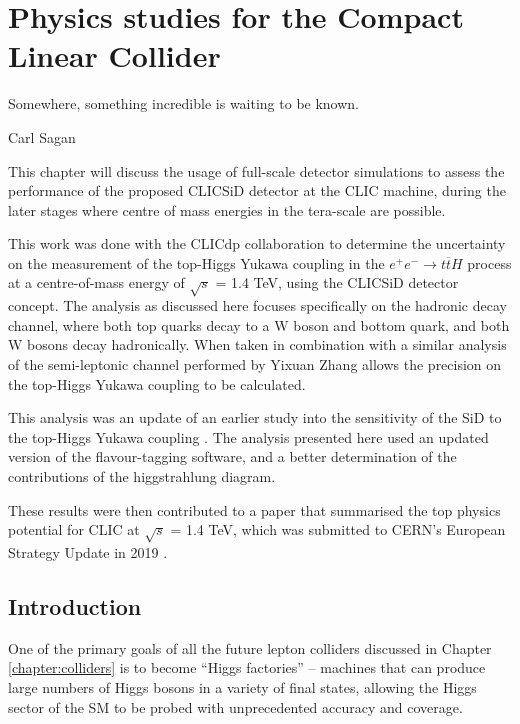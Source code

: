 
\chapter{Physics studies for the Compact Linear Collider}
\label{chapter:analysis}

\epigraph{Somewhere, something incredible is waiting to be known.}{Carl Sagan}

This chapter will discuss the usage of full-scale detector simulations to assess the performance of the proposed \acrshort{CLIC}\textunderscore \acrshort{SiD} detector at the \acrlong{CLIC} machine, during the later stages where centre of mass energies in the tera-scale are possible.

This work was done with the \acrfull{CLICdp} collaboration to determine the uncertainty on the measurement of the top-Higgs Yukawa coupling in the $e^+ e^- \rightarrow t\overline{t}H$ process at a centre-of-mass energy of $\sqrt{s}$ = 1.4 TeV, using the \acrshort{CLIC}\textunderscore \acrshort{SiD} detector concept. The analysis as discussed here focuses specifically on the hadronic decay channel, where both top quarks decay to a W boson and bottom quark, and both W bosons decay hadronically. When taken in combination with a similar analysis of the semi-leptonic channel performed by Yixuan Zhang  allows the precision on the top-Higgs Yukawa coupling to be calculated.

This analysis was an update of an earlier study into the sensitivity of the \acrshort{SiD} to the top-Higgs Yukawa coupling  . The analysis presented here used an updated version of the flavour-tagging software, and a better determination of the contributions of the higgstrahlung diagram.

These results were then contributed to a paper that summarised the top physics potential for \acrshort{CLIC} at $\sqrt{s}$ = 1.4 TeV, which was submitted to \acrshort{CERN}'s European Strategy Update in 2019 \cite{clic-top-quark-physics} \cite{clic-2018-summary}.

\section{Introduction}
One of the primary goals of all the future lepton colliders discussed in Chapter \ref{chapter:colliders} is to become ``Higgs factories'' -- machines that can produce large numbers of Higgs bosons in a variety of final states, allowing the Higgs sector of the \acrlong{SM} to be probed with unprecedented accuracy and coverage.

